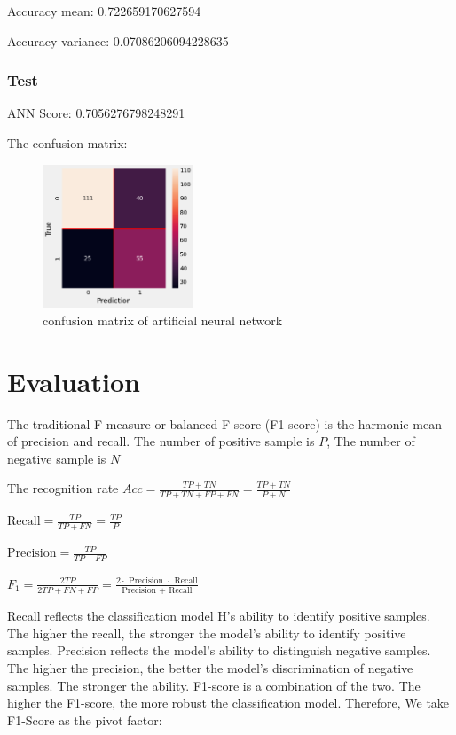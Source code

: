 \documentclass[11pt,en]{elegantpaper}
\begin{document}
Accuracy mean: 0.722659170627594

Accuracy variance: 0.07086206094228635
\subsubsection{Test}


ANN Score: 0.7056276798248291

The confusion matrix:
\begin{figure}[H]
    \centering
    \includegraphics[width=0.4\textwidth]{figure/conmat-ann.png}
    \caption{confusion matrix of artificial neural network}
\end{figure}


\section{Evaluation}
The traditional F-measure or balanced F-score (F1 score) is the harmonic mean of precision and recall.
The number of positive sample is $P$, The number of negative sample is $N$

The recognition rate $Acc=\frac{TP+TN}{TP+TN+FP+FN}=\frac{TP+TN}{P+N}$

$\text{Recall}=\frac{TP}{TP+FN}=\frac{TP}{P}$

$\text{Precision}=\frac{TP}{TP+FP}$

$F_1=\frac{2 T P}{2 T P+F N+F P}=\frac{2 \cdot \text { Precision } \cdot \text { Recall}}{\text {Precision }+\text { Recall}}$

Recall reflects the classification model H's ability to identify positive samples. The higher the recall, the stronger the model's ability to identify positive samples. Precision reflects the model's ability to distinguish negative samples. The higher the precision, the better the model's discrimination of negative samples. The stronger the ability. F1-score is a combination of the two. The higher the F1-score, the more robust the classification model. Therefore, We take F1-Score as the pivot factor:
\end{document}
